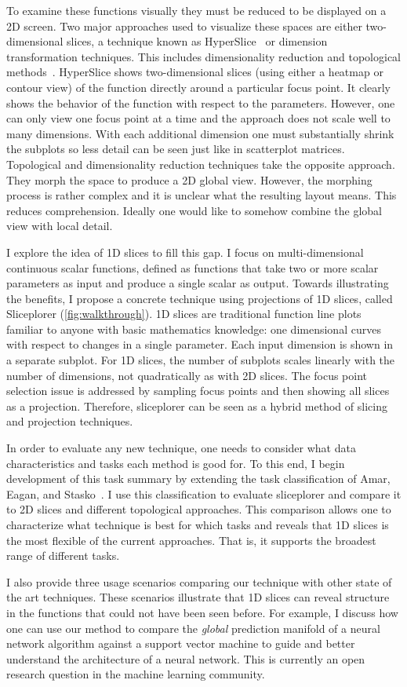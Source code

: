 To examine these functions visually they must be reduced to be
displayed on a 2D screen. 
Two major approaches used to visualize these spaces are either
two-dimensional slices, a technique known as HyperSlice~\cite{Wijk:1993} or dimension transformation techniques. This includes dimensionality
reduction and topological methods~\cite{Correa:2011,Carr:2003a}.  HyperSlice
shows two-dimensional slices (using either a heatmap or contour view)
of the function directly around a particular focus point. It clearly shows the
behavior of the function with respect to the parameters. However, one can only
view one focus point at a time and 
the approach does not scale well to many dimensions.
With each additional dimension one must substantially 
shrink the subplots so less detail can be seen just like in scatterplot matrices. Topological and dimensionality
reduction techniques take the opposite approach. They morph the space to
produce a 2D global view. However, the morphing process is rather
complex and it is unclear what the resulting layout means. This reduces
comprehension. Ideally one would like to somehow combine the global view with
local detail.

I explore the idea of 1D slices to fill this gap. 
I focus on 
multi-dimensional continuous scalar functions, defined as functions that take two or more
scalar parameters as input and produce a single scalar as output.
Towards illustrating the benefits, I propose a concrete technique using projections of 1D slices, called Sliceplorer (\autoref{fig:walkthrough}). 
1D slices are traditional function line plots familiar to anyone with
basic mathematics knowledge: one dimensional curves with respect to
changes in a single parameter. 
Each input dimension is shown in a separate subplot.
For 1D slices, the number of
subplots scales linearly with the number of dimensions, not quadratically as with 2D slices. 
The focus point selection issue is addressed by
sampling focus points and then showing all slices as a
projection. Therefore, sliceplorer can be seen as a hybrid method of slicing
and projection techniques. 

In order to evaluate any new technique, one needs to
consider what data characteristics and tasks each method is good for. 
To this
end, I begin development of this task summary by extending the task classification of Amar, Eagan, and Stasko~\cite{Amar:2005}. I use this classification to evaluate sliceplorer and compare it to 2D slices and different topological approaches. This comparison allows one to characterize what technique is best for which tasks and reveals that 1D slices is the most flexible of the current approaches. That is, it supports the broadest range of different tasks.

I also provide three usage scenarios comparing our technique with other state of the art techniques. These scenarios illustrate that 1D
slices can reveal structure in the functions that could not
have been seen before. For example, I discuss how one can use our
method to compare the \emph{global} prediction manifold of a neural
network algorithm against a support vector machine to guide and better understand the architecture of a neural network. This is currently an open research question in the machine learning community.

